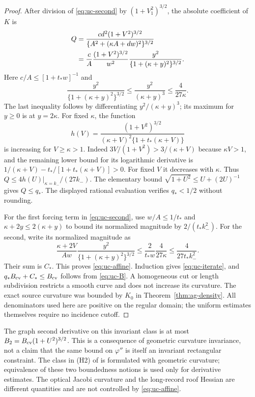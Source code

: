 \begin{proof}
After division of \eqref{eq:uc-second} by $(1+V_1^2)^{3/2}$, the
absolute coefficient of $K$ is
\begin{align}
 Q&=\frac{cd^2(1+V^2)^{3/2}}
       {\{A^2+(\kappa A+dw)^2\}^{3/2}}\notag\\
  &=\frac cA\frac{(1+V^2)^{3/2}}{w^2}
                  \frac{y^2}{\{1+(\kappa+y)^2\}^{3/2}}.
                                                    \label{eq:uc-Q}
\end{align}
Here $c/A\le[1+t_*w]^{-1}$ and
\[
 \frac{y^2}{\{1+(\kappa+y)^2\}^{3/2}}
 \le\frac{y^2}{(\kappa+y)^3}\le\frac4{27\kappa}.
\]
The last inequality follows by differentiating $y^2/(\kappa+y)^3$;
its maximum for $y\ge0$ is at $y=2\kappa$.
For fixed $\kappa$, the function
\[
 h(V)=\frac{(1+V^2)^{3/2}}
 {(\kappa+V)^2\{1+t_*(\kappa+V)\}}
\]
is increasing for $V\ge\kappa>1$. Indeed
$3V/(1+V^2)>3/(\kappa+V)$ because $\kappa V>1$, and the
remaining lower bound for its logarithmic derivative is
$1/(\kappa+V)-t_*/[1+t_*(\kappa+V)]>0$.
For fixed $V$ it decreases with $\kappa$. Thus
$Q\le 4h(U)|_{\kappa=k_-}/(27k_-)$.
The elementary bound $\sqrt{1+U^2}\le U+(2U)^{-1}$ gives $Q\le q_*$.
The displayed rational evaluation verifies $q_*<1/2$ without rounding.

For the first forcing term in \eqref{eq:uc-second}, use $w/A\le1/t_*$
and $\kappa+2y\le2(\kappa+y)$ to bound its normalized magnitude by
$2/(t_*k_-^2)$. For the second, write its normalized magnitude as
\[
 \frac{\kappa+2V}{Aw}
            \frac{y^2}{\{1+(\kappa+y)^2\}^{3/2}}
 \le\frac{2}{t_*w}\frac4{27\kappa}
 \le\frac4{27t_*k_-^2}.
\]
Their sum is $C_*$. This proves \eqref{eq:uc-affine}. Induction gives
\eqref{eq:uc-iterate}, and $q_*B_{\rm cv}+C_*\le B_{\rm cv}$ follows from
\eqref{eq:uc-B}. A homogeneous cut or length subdivision restricts a
smooth curve and does not increase its curvature. The exact source
curvature was bounded by $K_0$ in Theorem~\ref{thm:ag-density}.
All denominators used here are positive on the regular domain; the
uniform estimates themselves require no incidence cutoff.
\end{proof}

\begin{remark}
The graph second derivative on this invariant class is at most
$B_2=B_{\rm cv}(1+U^2)^{3/2}$. This is a consequence of geometric curvature
invariance, not a claim that the same bound on $\varphi''$ is itself
an invariant rectangular constraint. The class in (H2) of
\cite{DZUniform} is formulated with geometric curvature; equivalence
of these two boundedness notions is used only for derivative estimates.
The optical Jacobi curvature and the long-record roof Hessian are different
quantities and are not controlled by \eqref{eq:uc-affine}.
\end{remark}
